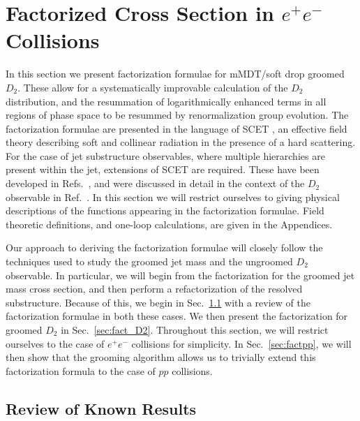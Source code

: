 \documentclass[a4paper,11pt]{article}
\DeclareRobustCommand{\Sec}[1]{Sec.~\ref{#1}}
\DeclareRobustCommand{\Ref}[1]{Ref.~\cite{#1}}
\DeclareRobustCommand{\Refs}[1]{Refs.~\cite{#1}}
\begin{document}
\section{Factorized Cross Section in $e^+e^-$ Collisions}\label{sec:factee}


In this section we present factorization formulae for mMDT/soft drop groomed $D_2$. These allow for a systematically improvable calculation of the $D_2$ distribution, and the resummation of logarithmically enhanced terms in all regions of phase space to be resummed by renormalization group evolution. The factorization formulae are presented in the language of SCET \cite{Bauer:2000yr,Bauer:2001ct,Bauer:2001yt,Bauer:2002nz}, an effective field theory describing soft and collinear radiation in the presence of a hard scattering. For the case of jet substructure observables, where multiple hierarchies are present within the jet, extensions of SCET are required. These have been developed in  \Refs{Bauer:2011uc,Larkoski:2015zka,Larkoski:2015kga,Pietrulewicz:2016nwo}, and were discussed in detail in the context of the $D_2$ observable in \Ref{Larkoski:2015kga}. In this section we will restrict ourselves to giving physical descriptions of the functions appearing in the factorization formulae. Field theoretic definitions, and one-loop calculations, are given in the Appendices. 

Our approach to deriving the factorization formulae will closely follow the techniques used to study the groomed jet mass and the ungroomed $D_2$ observable. In particular, we will begin from the factorization for the groomed jet mass cross section, and then perform a refactorization of the resolved substructure. Because of this, we begin in \Sec{sec:fact_review} with a review of the factorization formulae in both these cases. We then present the factorization for groomed $D_2$ in \Sec{sec:fact_D2}. Throughout this section, we will restrict ourselves to the case of $e^+e^-$ collisions for simplicity. In \Sec{sec:factpp}, we will then show that the grooming algorithm allows us to trivially extend this factorization formula to the case of $pp$ collisions.


\subsection{Review of Known Results}\label{sec:fact_review}
\end{document}
